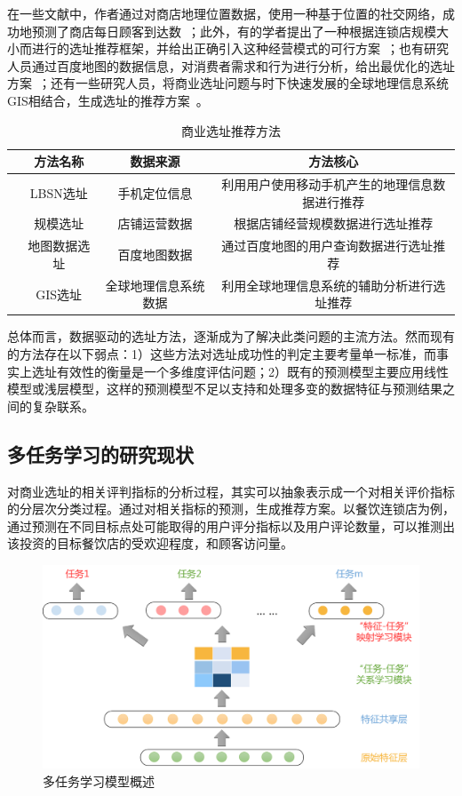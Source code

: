 \documentclass{llncs}
\begin{document}
在一些文献中，作者通过对商店地理位置数据，使用一种基于位置的社交网络，成功地预测了商店每日顾客到达数~\cite{LBSN}；此外，有的学者提出了一种根据连锁店规模大小而进行的选址推荐框架，并给出正确引入这种经营模式的可行方案~\cite{chainDev,Fu2015Modeling}；也有研究人员通过百度地图的数据信息，对消费者需求和行为进行分析，给出最优化的选址方案~\cite{DengYue}；还有一些研究人员，将商业选址问题与时下快速发展的全球地理信息系统GIS相结合，生成选址的推荐方案~\cite{HeJiexin}。

\begin{table}[!hpt]
	\centering
	\caption{商业选址推荐方法}
	\label{tb:reco-method}
	\begin{tabular}{cc|c|c}
		\hline
		& \textbf{方法名称}  & \textbf{数据来源} & \textbf{方法核心}  \\ \hline
		& LBSN选址 & 手机定位信息  & 利用用户使用移动手机产生的地理信息数据进行推荐       \\ %
		& 规模选址   & 店铺运营数据     & 根据店铺经营规模数据进行选址推荐                                \\ %
		& 地图数据选址  & 百度地图数据  & 通过百度地图的用户查询数据进行选址推荐                                \\ %
		& GIS选址  & 全球地理信息系统数据 & 利用全球地理信息系统的辅助分析进行选址推荐                  \\ \hline
	\end{tabular}
\end{table}

总体而言，数据驱动的选址方法，逐渐成为了解决此类问题的主流方法。然而现有的方法存在以下弱点：1）这些方法对选址成功性的判定主要考量单一标准，而事实上选址有效性的衡量是一个多维度评估问题；2）既有的预测模型主要应用线性模型或浅层模型，这样的预测模型不足以支持和处理多变的数据特征与预测结果之间的复杂联系。
\subsection{多任务学习的研究现状}
对商业选址的相关评判指标的分析过程，其实可以抽象表示成一个对相关评价指标的分层次分类过程。通过对相关指标的预测，生成推荐方案。以餐饮连锁店为例，通过预测在不同目标点处可能取得的用户评分指标以及用户评论数量，可以推测出该投资的目标餐饮店的受欢迎程度，和顾客访问量。

\begin{figure}
	\centering
	\includegraphics[width=0.8\columnwidth]{figures/multiLearn.png}
	\caption{多任务学习模型概述}
	\label{MTLmodel}
\end{figure}
\end{document}
